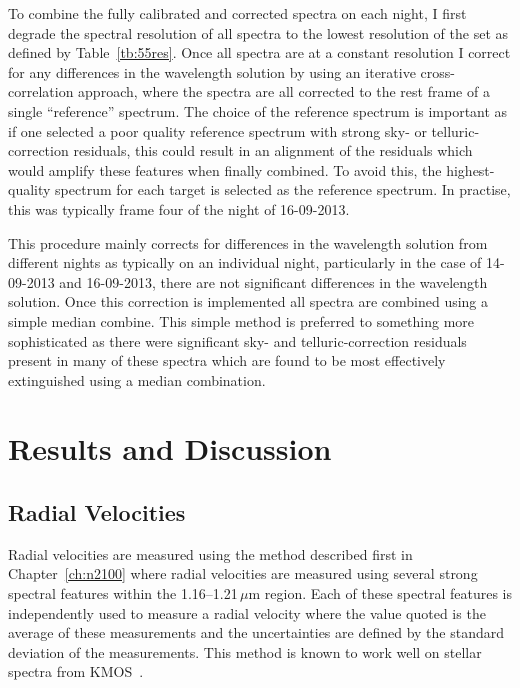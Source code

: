 To combine the fully calibrated and corrected spectra on each night, I first degrade the spectral resolution of all spectra to the lowest resolution of the set as defined by Table~\ref{tb:55res}.
Once all spectra are at a constant resolution I correct for any differences in the wavelength solution by using an iterative cross-correlation approach, where the spectra are all corrected to the rest frame of a single ``reference'' spectrum.
The choice of the reference spectrum is important as if one selected a poor quality reference spectrum with strong sky- or telluric-correction residuals, this could result in an alignment of the residuals which would amplify these features when finally combined.
To avoid this, the highest-quality spectrum for each target is selected as the reference spectrum.
In practise, this was typically frame four of the night of 16-09-2013.

This procedure mainly corrects for differences in the wavelength solution from different nights as typically on an individual night, particularly in the case of 14-09-2013 and 16-09-2013, there are not significant differences in the wavelength solution.
Once this correction is implemented all spectra are combined using a simple median combine.
This simple method is preferred to something more sophisticated as there were significant sky- and telluric-correction residuals present in many of these spectra which are found to be most effectively extinguished using a median combination.



\section{Results and Discussion} %
\label{sec:ngc55results}

\subsection{Radial Velocities} %
\label{sub:rvs}
Radial velocities are measured using the method described first in Chapter~\ref{ch:n2100} where radial velocities are measured using several strong spectral features within the 1.16--1.21\,$\mu$m region.
Each of these spectral features is independently used to measure a radial velocity where the value quoted is the average of these measurements and the uncertainties are defined by the standard deviation of the measurements.
This method is known to work well on stellar spectra from KMOS~\cite{2015ApJ...798...23L,2015ApJ...803...14P,2016arXiv160202702P}.

